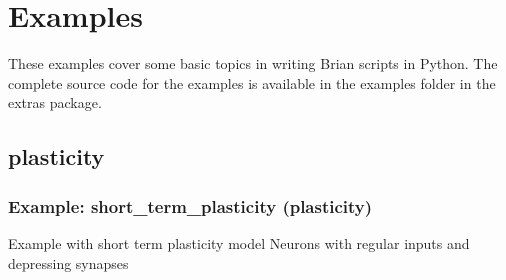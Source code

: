 \documentclass[letterpaper,10pt,english]{manual}
\begin{document}
\resetcurrentobjects
\hypertarget{--doc-examples}{}

\section{Examples}

These examples cover some basic topics in writing Brian scripts in Python. The
complete source code for the examples is available in the examples folder
in the extras package.


\subsection{plasticity}

\resetcurrentobjects
\hypertarget{--doc-examples-plasticity_short_term_plasticity}{}

\hypertarget{index-79}{}\subsubsection{Example: short\_term\_plasticity (plasticity)}

Example with short term plasticity model
Neurons with regular inputs and depressing synapses
\end{document}
